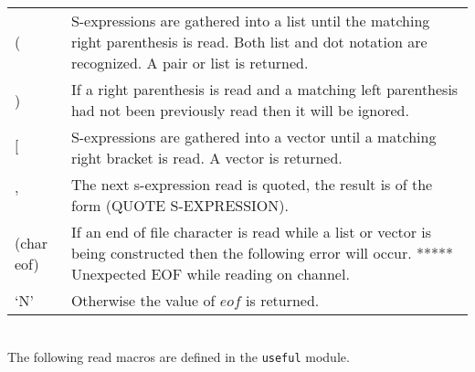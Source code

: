\begin{tabular}{lp{12.0cm}}
    ( &             S-expressions  are  gathered into a list until
                  the matching right parenthesis is read.   Both
                  list  and dot notation are recognized.  A pair
                  or list is returned.\\
    ) &             If a right parenthesis is read and a  matching
                  left  parenthesis had not been previously read
                  then it will be ignored.\\
    $[$ &       S-expressions are gathered into a vector until
                  a matching right bracket is read.  A vector is
                  returned.\\
    '        &      The next  s-expression  read  is  quoted,  the
                  result is of the form (QUOTE S-EXPRESSION).\\
    (char eof) &    If  an  end  of file character is read while a
                  list or vector is being constructed  then  the
                  following error will occur.
                  *****  Unexpected EOF while reading on channel.\\
    `N' &	Otherwise the value of $eof$ is returned.\\
\end{tabular}\\

    The following read macros are defined in the {\tt useful} module.

